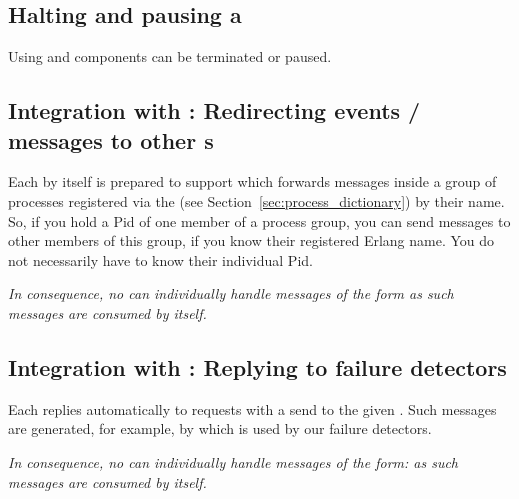\subsection{\texorpdfstring{Halting and pausing a }
{Halting and pausing a gen\_component}}

Using  and
 components can be terminated or
paused.

\subsection{\texorpdfstring{Integration with :
  Redirecting events / messages  to other s}
  {Integration with process\_dictionary:
  Redirecting events / messages  to other gen\_components}}

Each  by itself is prepared to support
 which forwards messages inside a
group of processes registered via the  (see
Section~\ref{sec:process_dictionary}) by their name. So, if you hold a Pid
of one member of a process group, you can send messages to other members of
this group, if you know their registered Erlang name. You do not necessarily
have to know their individual Pid.

\emph{In consequence, no  can individually handle
  messages of the form  \code{_, _\}} as such
  messages are consumed by  itself.}

\subsection{\texorpdfstring{Integration with :
  Replying to failure detectors}
  {Integration with fd\_pinger: Replying to failure detectors}}

Each  replies automatically to  requests with a  send to the given .  Such
messages are generated, for example, by  which is used
by our  failure detectors.

\emph{In consequence, no  can individually handle
messages of the form:  as such messages are consumed by
 itself.}


